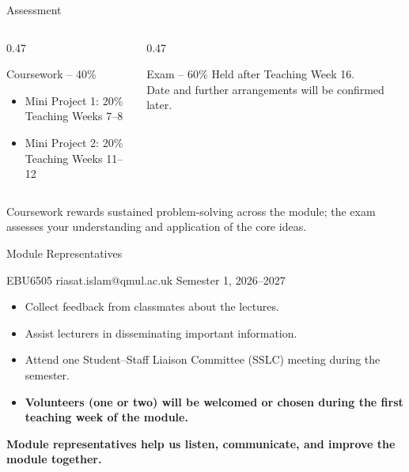 \documentclass[aspectratio=169]{beamer}
\begin{document}
\begin{frame}{Assessment}
\begin{columns}[T]
  \begin{column}{0.47\textwidth}
    \begin{block}{Coursework -- 40\%}
    \begin{itemize}
      \item Mini Project 1: 20\%\\
      \small Teaching Weeks 7--8
      \item Mini Project 2: 20\%\\
      \small Teaching Weeks 11--12
    \end{itemize}
    \end{block}
  \end{column}
  \begin{column}{0.47\textwidth}
    \begin{block}{Exam -- 60\%}
    Held after Teaching Week 16.\\[0.2cm]
    Date and further arrangements will be confirmed later.
    \end{block}
  \end{column}
\end{columns}

\vspace{0.35cm}
\begin{center}
Coursework rewards sustained problem-solving across the module; the exam assesses your understanding and application of the core ideas.
\end{center}
\end{frame}

\begin{frame}{Module Representatives}
\begin{center}
\scriptsize EBU6505 \hfill riasat.islam@qmul.ac.uk \hfill Semester 1, 2026--2027
\end{center}
\vspace{0.25cm}
\begin{itemize}
  \item Collect feedback from classmates about the lectures.
  \item Assist lecturers in disseminating important information.
  \item Attend one Student--Staff Liaison Committee (SSLC) meeting during the semester.
  \item {\color{red}\textbf{Volunteers (one or two) will be welcomed or chosen during the first teaching week of the module.}}
\end{itemize}

\vspace{0.45cm}
\begin{center}
\textbf{Module representatives help us listen, communicate, and improve the module together.}
\end{center}
\end{frame}
\end{document}
